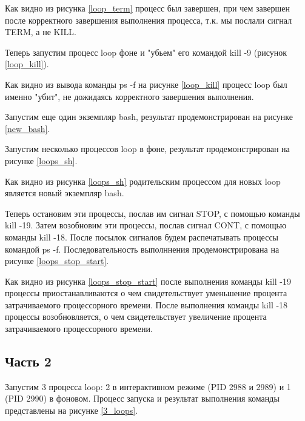 Как видно из рисунка \ref{loop_term} процесс был завершен, при чем завершен после корректного завершения выполнения процесса, т.к. мы послали сигнал TERM, а не KILL.

Теперь запустим процесс loop фоне и "убьем" его командой kill -9 (рисунок \ref{loop_kill}).


Как видно из вывода команды ps -f на рисунке \ref{loop_kill} процесс loop был именно "убит", не дожидаясь корректного завершения выполнения.

Запустим еще один экземпляр bash, результат продемонстрирован на рисунке \ref{new_bash}.


Запустим несколько процессов loop в фоне, результат продемонстрирован на рисунке \ref{loops_sh}.


Как видно из рисунка \ref{loops_sh} родительским процессом для новых loop является новый экземпляр bash.

 Теперь остановим эти процессы, послав им сигнал STOP, с помощью команды kill -19. Затем возобновим эти процессы, послав сигнал CONT, с помощью команды kill -18. После посылок сигналов будем распечатывать процессы командой ps -f. Последовательность выполннения продемонстрирована на рисунке \ref{loops_stop_start}.


 Как видно из рисунка \ref{loops_stop_start} после выполнения команды kill -19 процессы приостанавливаются о чем свидетельствует уменьшение процента затрачиваемого процессорного времени. После выполнения команды kill -18 процессы возобновляется, о чем свидетельствует увеличение процента затрачиваемого процессорного времени.

 \subsection{Часть 2}

 Запустим 3 процесса loop: 2 в интерактивном режиме (PID 2988 и 2989) и 1 (PID 2990) в фоновом. Процесс запуска и результат выполнения команды представлены на рисунке \ref{3_loops}.


